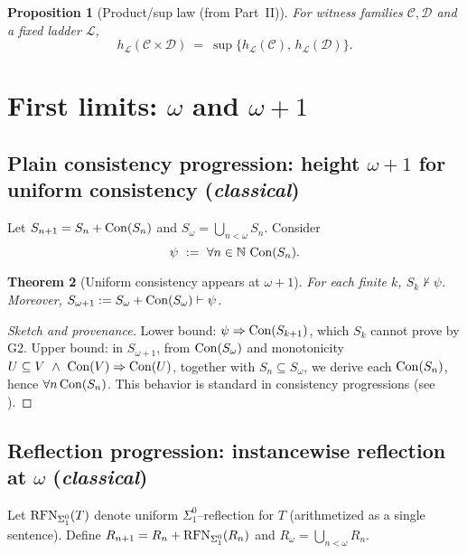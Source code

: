 \documentclass[11pt]{article}
\newtheorem{theorem}{Theorem}[section]
\newtheorem{proposition}[theorem]{Proposition}
\theoremstyle{definition}
\theoremstyle{remark}
\begin{document}
\begin{proposition}[Product/sup law (from Part~II)]
For witness families $\mathcal C,\mathcal D$ and a fixed ladder $\mathcal L$,
\[
h_{\mathcal L}(\mathcal C\times \mathcal D)\ =\ \sup\bigl\{h_{\mathcal L}(\mathcal C),\,h_{\mathcal L}(\mathcal D)\bigr\}.
\]
\end{proposition}

\section{First limits: \texorpdfstring{$\omega$}{ω} and \texorpdfstring{$\omega{+}1$}{ω+1}}

\subsection{Plain consistency progression: height \texorpdfstring{$\omega{+}1$}{ω+1} for uniform consistency (\emph{classical})}
Let $S_{n+1}=S_n+\mathrm{Con}(S_n)$ and $S_\omega=\bigcup_{n<\omega} S_n$. Consider
\[
\psi\ :=\ \forall n\in \mathbb N\ \Con(S_n).
\]

\begin{theorem}[Uniform consistency appears at $\omega{+}1$]\label{IV:thm:omega-plus-one}
For each finite $k$, $S_k\nvdash \psi$. Moreover, $S_{\omega+1}:=S_\omega+\mathrm{Con}(S_\omega)\vdash \psi$.
\end{theorem}

\begin{proof}[Sketch and provenance]
Lower bound: $\psi\Rightarrow \mathrm{Con}(S_{k+1})$, which $S_k$ cannot prove by G2.
Upper bound: in $S_{\omega+1}$, from $\mathrm{Con}(S_\omega)$ and monotonicity
$U\subseteq V\ \wedge\ \mathrm{Con}(V)\Rightarrow \mathrm{Con}(U)$, together with $S_n\subseteq S_\omega$,
we derive each $\mathrm{Con}(S_n)$, hence $\forall n\,\mathrm{Con}(S_n)$. This behavior is standard in consistency progressions
(see \cite{Feferman1962,HajekPudlak}).
\end{proof}

\subsection{Reflection progression: instancewise reflection at \texorpdfstring{$\omega$}{ω} (\emph{classical})}
Let $\mathrm{RFN}_{\Sigma^0_1}(T)$ denote uniform $\Sigma^0_1$--reflection for $T$ (arithmetized as a single sentence).
Define $R_{n+1}=R_n+\mathrm{RFN}_{\Sigma^0_1}(R_n)$ and $R_\omega=\bigcup_{n<\omega}R_n$.
\end{document}
